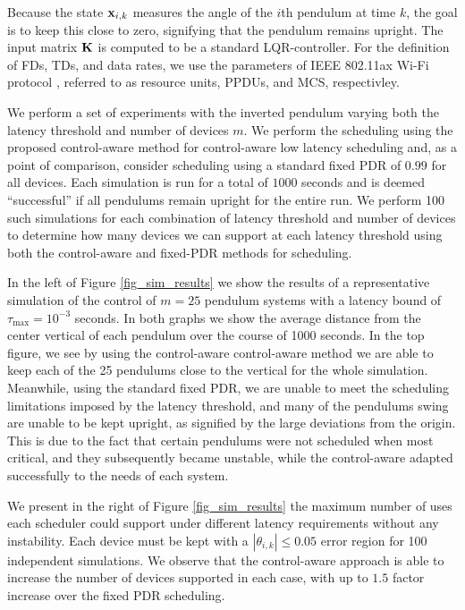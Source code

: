 \documentclass{article}
\begin{document}
Because the state ${\mathbf x}_{i,k}$ measures the angle of the $i$th pendulum at time $k$, the goal is to keep this close to zero, signifying that the pendulum remains upright. The input matrix ${\mathbf K}$ is computed to be a standard LQR-controller. For the definition of FDs, TDs, and data rates, we use the parameters of IEEE 802.11ax Wi-Fi protocol \cite{liu2014ieee}, referred to as resource units, PPDUs, and MCS, respectivley.

We perform a set of experiments with the inverted pendulum varying both the latency threshold and number of devices $m$. We perform the scheduling using the proposed control-aware method for control-aware low latency scheduling and, as a point of comparison, consider scheduling using a standard fixed PDR of $0.99$ for all devices. Each simulation is run for a total of $1000$ seconds and is deemed ``successful'' if all pendulums remain upright for the entire run. We perform 100 such simulations for each combination of latency threshold and number of devices to determine how many devices we can support at each latency threshold using both the control-aware and fixed-PDR methods for scheduling.

In the left of Figure \ref{fig_sim_results} we show the results of a representative simulation of the control of $m=25$ pendulum systems with a latency bound of $\tau_{\max} = 10^{-3}$ seconds. In both graphs we show the average distance from the center vertical of each pendulum over the course of 1000 seconds. In the top figure, we see by using the control-aware control-aware method we are able to keep each of the 25 pendulums close to the vertical for the whole simulation. Meanwhile, using the standard fixed PDR, we are unable to meet the scheduling limitations imposed by the latency threshold, and many of the pendulums swing are unable to be kept upright, as signified by the large deviations from the origin. This is due to the fact that certain pendulums were not scheduled when most critical, and they subsequently became unstable, while the control-aware adapted successfully to the needs of each system.


We present in the right of Figure \ref{fig_sim_results} the maximum number of uses each scheduler could support under different latency requirements without any instability. Each device must be kept with a  $|\theta_{i,k}| \leq 0.05$ error region for 100 independent simulations. We observe that the control-aware approach is able to increase the number of devices supported in each case, with up to $1.5$ factor increase over the fixed PDR scheduling. 
\end{document}
